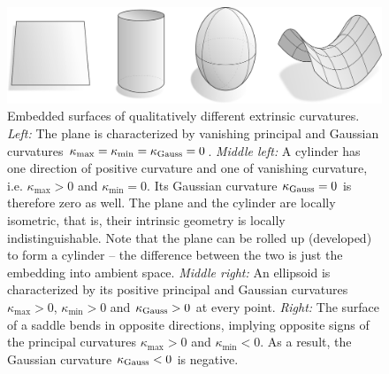 \begin{figure}
    \centering
    \includegraphics[width=1.\textwidth]{figures/curvature_surfaces.pdf}
    \caption{\small
        Embedded surfaces of qualitatively different extrinsic curvatures.
        \textit{Left:}
            The plane is characterized by vanishing principal and Gaussian curvatures
            $\kappa_{\max} = \kappa_{\min} = \kappa_{\textup{Gauss}} = 0$.
        \textit{Middle left:}
            A cylinder has one direction of positive curvature and one of vanishing curvature, i.e. 
            $\kappa_{\max} > 0$ and $\kappa_{\min} = 0$.
            Its Gaussian curvature $\kappa_{\textup{Gauss}} = 0$ is therefore zero as well.
            The plane and the cylinder are locally isometric, that is, their intrinsic geometry is locally indistinguishable.
            Note that the plane can be rolled up (developed) to form a cylinder -- the difference between the two is just the embedding into ambient space.
        \textit{Middle right:}
            An ellipsoid is characterized by its positive principal and Gaussian curvatures $\kappa_{\max} > 0$, $\kappa_{\min} > 0$ and $\kappa_{\textup{Gauss}} > 0$ at every point.
        \textit{Right:}
            The surface of a saddle bends in opposite directions, implying opposite signs of the principal curvatures $\kappa_{\max} > 0$ and $\kappa_{\min} < 0$.
            As a result, the Gaussian curvature $\kappa_{\textup{Gauss}} < 0$ is negative.
     }
    \label{fig:curvature_surfaces}
\end{figure}

